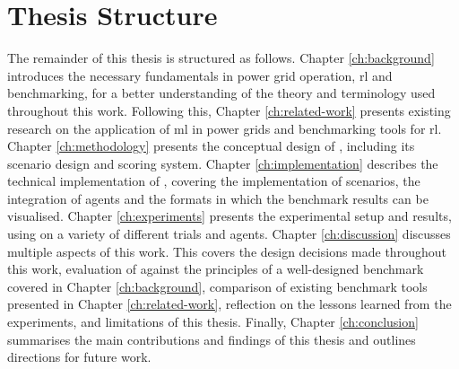 \section{Thesis Structure}\label{sec:thesis-structure}
The remainder of this thesis is structured as follows. Chapter \ref{ch:background} introduces the necessary fundamentals in power grid operation, \ac{rl} and benchmarking, for a better understanding of the theory and terminology used throughout this work. Following this, Chapter \ref{ch:related-work} presents existing research on the application of \ac{ml} in power grids and benchmarking tools for \ac{rl}. Chapter \ref{ch:methodology} presents the conceptual design of \benchmark, including its scenario design and scoring system. Chapter \ref{ch:implementation} describes the technical implementation of \benchmark, covering the implementation of scenarios, the integration of agents and the formats in which the benchmark results can be visualised. Chapter \ref{ch:experiments} presents the experimental setup and results, using \benchmark on a variety of different trials and agents. Chapter \ref{ch:discussion} discusses multiple aspects of this work. This covers the design decisions made throughout this work, evaluation of \benchmark against the principles of a well-designed benchmark covered in Chapter \ref{ch:background}, comparison of existing benchmark tools presented in Chapter \ref{ch:related-work}, reflection on the lessons learned from the experiments, and limitations of this thesis. Finally, Chapter \ref{ch:conclusion} summarises the main contributions and findings of this thesis and outlines directions for future work. 